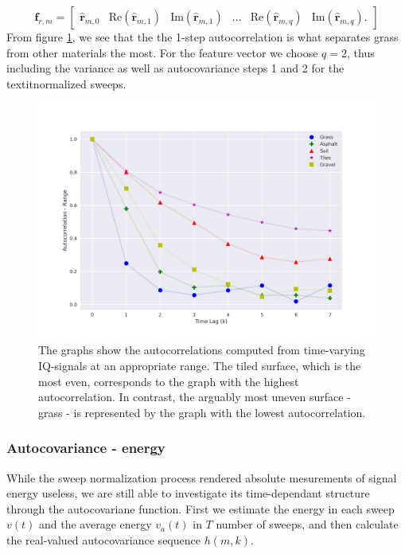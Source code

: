 \begin{equation}
	\mathbf{f}_{r,m} = 
	\begin{bmatrix}
		\hat{\mathbf{r}}_{m,0}  & \text{Re}(\hat{\mathbf{r}}_{m,1} ) & \text{Im}(\hat{\mathbf{r}}_{m,1} ) & ... & \text{Re}(\hat{\mathbf{r}}_{m,q} ) & \text{Im}(\hat{\mathbf{r}}_{m,q} ).
	\end{bmatrix}
\end{equation}
From figure \ref{fig:autocorr_range}, we see that the the 1-step autocorrelation is what separates grass from other materials the most. For the feature vector we choose $q=2$, thus including the variance as well as autocovariance steps 1 and 2 for the textit{normalized} sweeps.


\begin{figure}[h]
	\centering
	\includegraphics[scale=0.45]{figs_temp/features/autocorr_range.png}
	\caption{The graphs show the autocorrelations computed from time-varying IQ-signals at an appropriate range. The tiled surface, which is the most even, corresponds to the graph with the highest autocorrelation. In contrast, the arguably most uneven surface - grass - is represented by the graph with the lowest autocorrelation.}
	\label{fig:autocorr_range}
\end{figure}


\subsubsection{Autocovariance - energy}

While the sweep normalization process rendered absolute mesurements of signal energy useless, we are still able to investigate its time-dependant structure through the autocovariane function. First we estimate the energy in each sweep $v(t)$ and the average energy $v_a(t)$ in $T$ number of sweeps, and then calculate the real-valued autocovariance sequence $h(m,k)$. 


